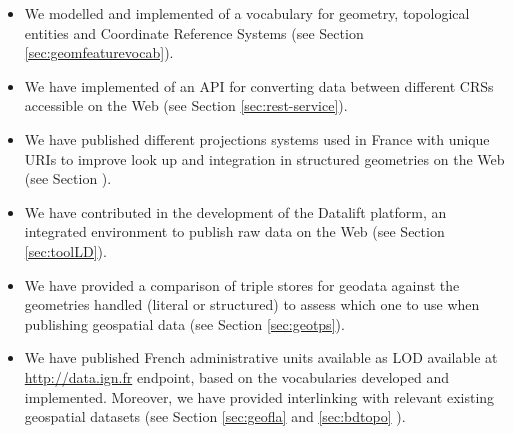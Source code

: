 \begin{itemize}
\item We modelled and implemented of a vocabulary for geometry, topological entities and Coordinate Reference Systems (see Section \ref{sec:geomfeaturevocab}).
\item We have implemented of an API for converting data between different CRSs accessible on the Web (see Section \ref{sec:rest-service}).
\item We have published different projections systems used in France with unique URIs to improve look up and integration in structured geometries on the Web (see Section ).
\item We have contributed in the development of the Datalift platform, an integrated environment to publish raw data on the Web (see Section \ref{sec:toolLD}).
\item We have provided a comparison of triple stores for geodata against the geometries handled (literal or structured) to assess which one to use when publishing geospatial data (see Section \ref{sec:geotps}). 
\item We have published French administrative units available as LOD available at \url{http://data.ign.fr} endpoint, based on the vocabularies developed and implemented. Moreover, we have provided interlinking with relevant existing geospatial datasets (see Section \ref{sec:geofla} and \ref{sec:bdtopo} ).


\end{itemize}
